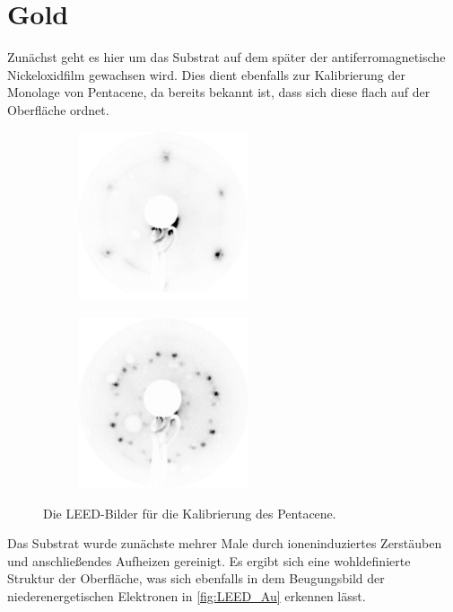     \section{Gold}
        Zunächst geht es hier um das Substrat auf dem später der antiferromagnetische Nickeloxidfilm gewachsen wird.
        Dies dient ebenfalls zur Kalibrierung der Monolage von Pentacene, da bereits bekannt ist, dass sich diese flach auf der Oberfläche ordnet.
        \begin{figure}
            \centering
            \begin{subfigure}{0.48\textwidth}
                \centering
                \includegraphics[height=5cm]{./content/pictures/Au/2021_06_08_002_Au(111)_75eV}
                \label{fig:LEED_Au}
            \end{subfigure}
            \begin{subfigure}{0.48\textwidth}
                \centering
                \includegraphics[height=5cm]{./content/pictures/Au+5A/021_Au(111)+5A(40)_16eV.png}
                \label{fig:LEED_Au+5A}
            \end{subfigure}
            \caption{Die LEED-Bilder für die Kalibrierung des Pentacene.}
        \label{fig:Substrate}
        \end{figure}
        Das Substrat wurde zunächste mehrer Male durch ioneninduziertes Zerstäuben und anschließendes Aufheizen gereinigt.
        Es ergibt sich eine wohldefinierte Struktur der Oberfläche, was sich ebenfalls in dem Beugungsbild der niederenergetischen Elektronen in \autoref{fig:LEED_Au} erkennen lässt.








